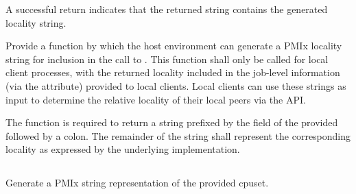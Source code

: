 \begin{arglist}
\end{arglist}

A successful return indicates that the returned string contains the generated locality string.

\returnsimple

\descr

Provide a function by which the host environment can generate a \ac{PMIx} locality string for inclusion in the call to . This function shall only be called for local client processes, with the returned locality included in the job-level information (via the  attribute) provided to local clients. Local clients can use these strings as input to determine the relative locality of their local peers via the  \ac{API}.

The function is required to return a string prefixed by the  field of the provided  followed by a colon. The remainder of the string shall represent the corresponding locality as expressed by the underlying implementation.

\subsection{}

\summary

Generate a \ac{PMIx} string representation of the provided cpuset.

\format


\begin{arglist}
\end{arglist}

